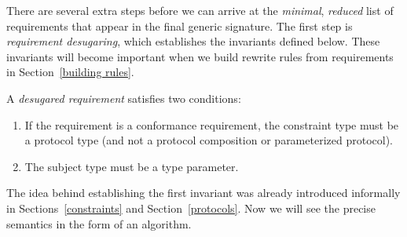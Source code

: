 \documentclass[../generics]{subfiles}
\begin{document}
There are several extra steps before we can arrive at the \emph{minimal}, \emph{reduced} list of requirements that appear in the final generic signature. The first step is \emph{requirement desugaring}, which establishes the invariants defined below. These invariants will become important when we build rewrite rules from requirements in Section~\ref{building rules}.
\begin{definition}\label{desugaredrequirementdef} A \emph{desugared requirement} satisfies two conditions:
\begin{enumerate}
\item If the requirement is a conformance requirement, the constraint type must be a protocol type (and not a protocol composition or parameterized protocol).
\item The subject type must be a type parameter.
\end{enumerate}
\end{definition}

The idea behind establishing the first invariant was already introduced informally in Sections~\ref{constraints} and Section~\ref{protocols}. Now we will see the precise semantics in the form of an algorithm.
\end{document}
